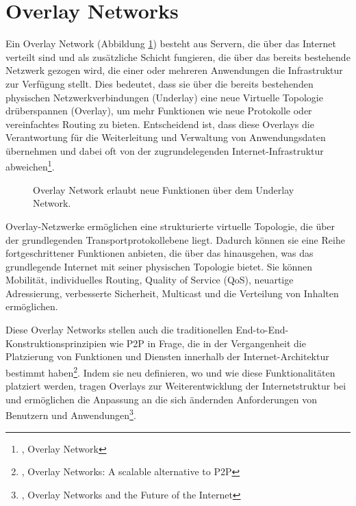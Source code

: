 \section{Overlay Networks}
\label{chap:overlay_networks}

Ein Overlay Network (Abbildung \ref{imgs:overlay_network}) besteht aus Servern, die über das Internet verteilt sind und als zusätzliche Schicht fungieren, die über das bereits bestehende Netzwerk gezogen wird, die einer oder mehreren Anwendungen die Infrastruktur zur Verfügung stellt. Dies bedeutet, dass sie über die bereits bestehenden physischen Netzwerkverbindungen (Underlay) eine neue Virtuelle Topologie drüberspannen (Overlay), um mehr Funktionen wie neue Protokolle oder vereinfachtes Routing zu bieten. Entscheidend ist, dass diese Overlays die Verantwortung für die Weiterleitung und Verwaltung von Anwendungsdaten übernehmen und dabei oft von der zugrundelegenden Internet-Infrastruktur abweichen\footnote{\cite{OverlayNetwork}, Overlay Network}.

\begin{figure}[h!]
    \centering
    
    \caption{Overlay Network erlaubt neue Funktionen über dem Underlay Network.}
    \label{imgs:overlay_network}
\end{figure}

Overlay-Netzwerke ermöglichen eine strukturierte virtuelle Topologie, die über der grundlegenden Transportprotokollebene liegt. Dadurch können sie eine Reihe fortgeschrittener Funktionen anbieten, die über das hinausgehen, was das grundlegende Internet mit seiner physischen Topologie bietet. Sie können Mobilität, individuelles Routing, Quality of Service (QoS), neuartige Adressierung, verbesserte Sicherheit, Multicast und die Verteilung von Inhalten ermöglichen.

Diese Overlay Networks stellen auch die traditionellen End-to-End-Konstruktionsprinzipien wie P2P in Frage, die in der Vergangenheit die Platzierung von Funktionen und Diensten innerhalb der Internet-Architektur bestimmt haben\footnote{\cite{AlternativeToP2P}, Overlay Networks: A scalable alternative to P2P}. Indem sie neu definieren, wo und wie diese Funktionalitäten platziert werden, tragen Overlays zur Weiterentwicklung der Internetstruktur bei und ermöglichen die Anpassung an die sich ändernden Anforderungen von Benutzern und Anwendungen\footnote{\cite{FutureOfTheInternet}, Overlay Networks and the Future of the Internet}.
